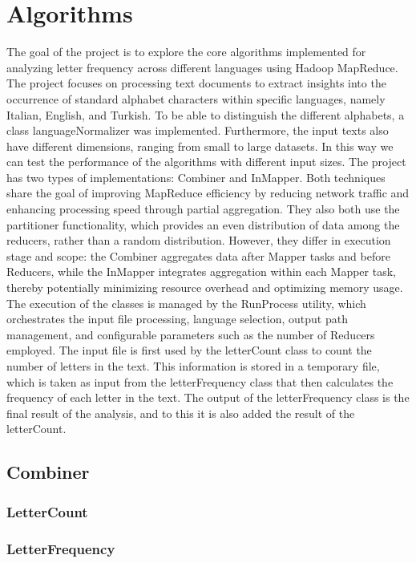 \chapter{Algorithms}


The goal of the project is to explore the core algorithms implemented for analyzing letter frequency across different languages using Hadoop MapReduce. 
The project focuses on processing text documents to extract insights into the occurrence of standard alphabet characters within specific languages, namely Italian, English, and Turkish. 
To be able to distinguish the different alphabets, a class languageNormalizer was implemented. 
Furthermore, the input texts also have different dimensions, ranging from small to large datasets.
In this way we can test the performance of the algorithms with different input sizes.
The project has two types of implementations: Combiner and InMapper. Both techniques share the goal of improving MapReduce efficiency by reducing network traffic and enhancing processing speed through partial aggregation. They also both use the partitioner functionality, which provides an even distribution of data among the reducers, rather than a random distribution. However, they differ in execution stage and scope: the Combiner aggregates data after Mapper tasks and before Reducers, while the InMapper integrates aggregation within each Mapper task, thereby potentially minimizing resource overhead and optimizing memory usage. 
The execution of the classes is managed by the RunProcess utility, which orchestrates the input file processing, language selection, output path management, and configurable parameters such as the number of Reducers employed. The input file is first used by the letterCount class to count the number of letters in the text. This information is stored in a temporary file, which is taken as input from the letterFrequency class that then calculates the frequency of each letter in the text. The output of the letterFrequency class is the final result of the analysis, and to this it is also added the result of the letterCount.

\section{Combiner}
\subsection{LetterCount}
\subsection{LetterFrequency}

